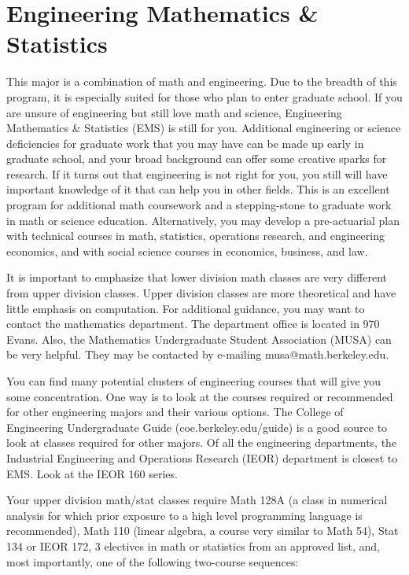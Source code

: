 \chapter*{Engineering Mathematics \& Statistics}

This major is a combination of math and engineering. Due to the breadth of this program, it is especially suited for those who plan to enter graduate school. If you are unsure of engineering but still love math and science, Engineering Mathematics \& Statistics (EMS) is still for you. Additional engineering or science deficiencies for graduate work that you may have can be made up early in graduate school, and your broad background can offer some creative sparks for research. If it turns out that engineering is not right for you, you still will have important knowledge of it that can help you in other fields. This is an excellent program for additional math coursework and a stepping-stone to graduate work in math or science education. Alternatively, you may develop a pre-actuarial plan with technical courses in math, statistics, operations research, and engineering economics, and with social science courses in economics, business, and law.

It is important to emphasize that lower division math classes are very different from upper division classes. Upper division classes are more theoretical and have little emphasis on computation. For additional guidance, you may want to contact the mathematics department. The department office is located in 970 Evans. Also, the Mathematics Undergraduate Student Association (MUSA) can be very helpful. They may be contacted by e-mailing {\selectfont musa@math.berkeley.edu}.

You can find many potential clusters of engineering courses that will give you some concentration. One way is to look at the courses required or recommended for other engineering majors and their various options. The College of Engineering Undergraduate Guide ({\selectfont coe.berkeley.edu/guide}) is a good source to look at classes required for other majors. Of all the engineering departments, the Industrial Engineering and Operations Research (IEOR) department is closest to EMS. Look at the IEOR 160 series.

Your upper division math/stat classes require Math 128A (a class in numerical analysis for which prior exposure to a high level programming language is recommended), Math 110 (linear algebra, a course very 
similar to Math 54), Stat 134 or IEOR 172, 3 electives in math or 
statistics from an approved list, and, most importantly, one of the following two-course sequences:

